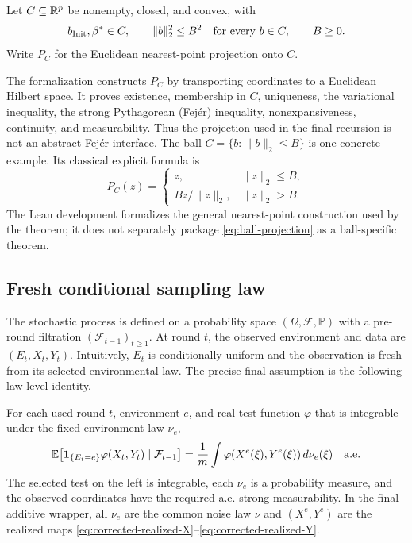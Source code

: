 \begin{assumption}
\label{ass:bounded-domain}
Let $C\subseteq\mathbb{R}^p$ be nonempty, closed, and convex, with
\begin{equation}
  b_{\rm Init},\beta^*\in C,
  \qquad
  \|b\|_2^2\le B^2\quad\text{for every }b\in C,
  \qquad B\ge0.
  \label{eq:bounded-domain}
\end{equation}
Write $P_C$ for the Euclidean nearest-point projection onto $C$.
\end{assumption}

The formalization constructs $P_C$ by transporting coordinates to a Euclidean
Hilbert space.  It proves existence, membership in $C$, uniqueness, the
variational inequality, the strong Pythagorean (Fej\'er) inequality,
nonexpansiveness, continuity, and measurability.  Thus the projection used in
the final recursion is not an abstract Fej\'er interface.  The ball
$C=\{b:\|b\|_2\le B\}$ is one concrete example.  Its classical explicit
formula is
\begin{equation}
  P_C(z)=
  \begin{cases}
    z,&\|z\|_2\le B,\\
    Bz/\|z\|_2,&\|z\|_2>B.
  \end{cases}
  \label{eq:ball-projection}
\end{equation}
The Lean development formalizes the general nearest-point construction used
by the theorem; it does not separately package \eqref{eq:ball-projection} as
a ball-specific theorem.

\subsection{Fresh conditional sampling law}

The stochastic process is defined on a probability space
$(\Omega,\mathcal F,\mathbb P)$ with a pre-round filtration
$(\mathcal F_{t-1})_{t\ge1}$.  At round $t$, the observed environment and data
are $(E_t,X_t,Y_t)$.  Intuitively, $E_t$ is conditionally uniform and the
observation is fresh from its selected environmental law.  The precise final
assumption is the following law-level identity.

\begin{assumption}
\label{ass:online-unbiasedness}
For each used round $t$, environment $e$, and real test function $\varphi$ that
is integrable under the fixed environment law $\nu_e$,
\begin{equation}
  \mathbb{E}\!\left[
    \mathbf 1_{\{E_t=e\}}\varphi(X_t,Y_t)
    \mid\mathcal F_{t-1}
  \right]
  =\frac1m\int\varphi(X^e(\xi),Y^e(\xi))\,d\nu_e(\xi)
  \quad\text{a.e.}
  \label{eq:fresh-conditional-law}
\end{equation}
The selected test on the left is integrable, each $\nu_e$ is a probability
measure, and the observed coordinates have the required a.e. strong
measurability.  In the final additive wrapper, all $\nu_e$ are the common
noise law $\nu$ and $(X^e,Y^e)$ are the realized maps
\eqref{eq:corrected-realized-X}--\eqref{eq:corrected-realized-Y}.
\end{assumption}

